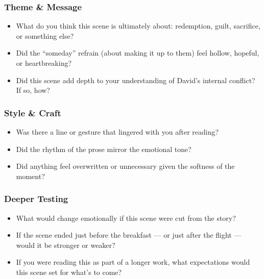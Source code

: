 \subsubsection*{Theme \& Message}

\begin{itemize}
  \item What do you think this scene is ultimately about: redemption, guilt, sacrifice, or something else?
  \item Did the “someday” refrain (about making it up to them) feel hollow, hopeful, or heartbreaking?
  \item Did this scene add depth to your understanding of David’s internal conflict? If so, how?
\end{itemize}

\subsubsection*{Style \& Craft}

\begin{itemize}
  \item Was there a line or gesture that lingered with you after reading?
  \item Did the rhythm of the prose mirror the emotional tone?
  \item Did anything feel overwritten or unnecessary given the softness of the moment?
\end{itemize}

\subsubsection*{Deeper Testing}

\begin{itemize}
  \item What would change emotionally if this scene were cut from the story?
  \item If the scene ended just before the breakfast — or just after the flight — would it be stronger or weaker?
  \item If you were reading this as part of a longer work, what expectations would this scene set for what’s to come?
\end{itemize}










